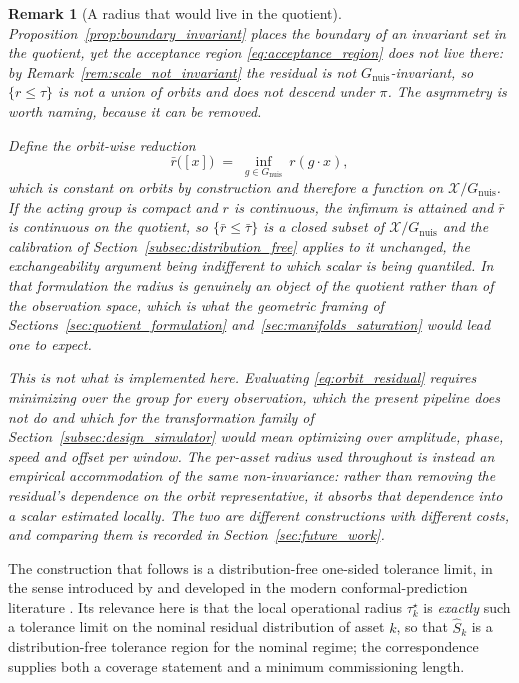 \documentclass[a4paper]{cas-sc}
\newtheorem{remark}{Remark}
\newcommand{\Gnuis}{\ensuremath{G_{\mathrm{nuis}}}}
\newcommand{\quotient}{\ensuremath{\mathcal{X}/G_{\mathrm{nuis}}}}
\newcommand{\residual}{\ensuremath{r}}
\begin{document}
\begin{remark}[A radius that would live in the quotient]
\label{rem:quotient_radius}
Proposition~\ref{prop:boundary_invariant} places the boundary of an invariant
set in the quotient, yet the acceptance region
\eqref{eq:acceptance_region} does not live there: by
Remark~\ref{rem:scale_not_invariant} the residual is not
\(\Gnuis\)-invariant, so \(\{\residual\le\tau\}\) is not a union of orbits and
does not descend under \(\pi\). The asymmetry is worth naming, because it can
be removed.

Define the orbit-wise reduction
\begin{equation}
\bar{\residual}\bigl([x]\bigr) \;=\; \inf_{g\in\Gnuis}\ \residual(g\cdot x),
\label{eq:orbit_residual}
\end{equation}
which is constant on orbits by construction and therefore a function on
\(\quotient\). If the acting group is compact and \(\residual\) is continuous,
the infimum is attained and \(\bar{\residual}\) is continuous on the quotient,
so \(\{\bar{\residual}\le\bar\tau\}\) is a closed subset of \(\quotient\) and
the calibration of Section~\ref{subsec:distribution_free} applies to it
unchanged, the exchangeability argument being indifferent to which scalar is
being quantiled. In that formulation the radius is genuinely an object of the
quotient rather than of the observation space, which is what the geometric
framing of Sections~\ref{sec:quotient_formulation}
and~\ref{sec:manifolds_saturation} would lead one to expect.

This is not what is implemented here. Evaluating
\eqref{eq:orbit_residual} requires minimizing over the group for every
observation, which the present pipeline does not do and which for the
transformation family of
Section~\ref{subsec:design_simulator} would mean optimizing over amplitude,
phase, speed and offset per window. The per-asset radius used throughout is
instead an empirical accommodation of the same non-invariance: rather than
removing the residual's dependence on the orbit representative, it absorbs
that dependence into a scalar estimated locally. The two are different
constructions with different costs, and comparing them is recorded in
Section~\ref{sec:future_work}.
\end{remark}

The construction that follows is a distribution-free one-sided tolerance
limit, in the sense introduced by \citet{wilks1941} and developed in the
modern conformal-prediction literature
\citep{papadopoulos2002,vovk2005,lei2018}. Its relevance here is that the
local operational radius \(\tau_k^\star\) is \emph{exactly} such a tolerance
limit on the nominal residual distribution of asset \(k\), so that
\(\widehat{S}_k\) is a distribution-free tolerance region for the nominal
regime; the correspondence supplies both a coverage statement and a minimum
commissioning length.
\end{document}
